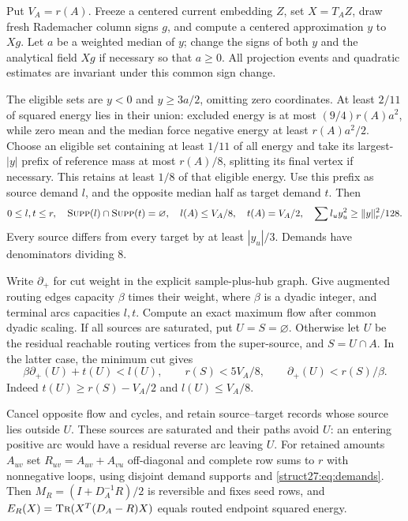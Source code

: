 \documentclass[11pt]{article}
\theoremstyle{remark}
\newcommand{\norm}[1]{\lVert#1\rVert}
\newcommand{\supp}{\textsc{Supp}}
\newcommand{\tr}{\textsc{Tr}}
\begin{document}
Put $V_A=r(A)$.
Freeze a centered current embedding $Z$, set $X=T_AZ$, draw fresh Rademacher
column signs $g$, and compute a centered approximation $y$ to $Xg$.
Let $a$ be a weighted median of $y$; change the signs of both $y$ and the
analytical field $Xg$ if necessary so that $a\ge0$.
All projection events and quadratic estimates are invariant under this common
sign change.

The eligible sets are $y<0$ and $y\ge3a/2$, omitting zero coordinates.
At least $2/11$ of squared energy lies in their union: excluded energy is at
most $(9/4)r(A)a^2$, while zero mean and the median force negative energy at
least $r(A)a^2/2$.
Choose an eligible set containing at least $1/11$ of all energy and take its
largest-$|y|$ prefix of reference mass at most $r(A)/8$, splitting its final
vertex if necessary.
This retains at least $1/8$ of that eligible energy.
Use this prefix as source demand $l$, and the opposite median half as target
demand $t$.
Then
\begin{equation}\label{struct27:eq:demands}
 0\le l,t\le r,\quad\supp(l)\cap\supp(t)=\varnothing,
 \quad l(A)\le V_A/8,\quad t(A)=V_A/2,
 \quad\sum l_uy_u^2\ge\norm{y}_r^2/128.
\end{equation}
Every source differs from every target by at least $|y_u|/3$.
Demands have denominators dividing 8.

Write $\partial_+$ for cut weight in the explicit sample-plus-hub graph.
Give augmented routing edges capacity $\beta$ times their weight, where $\beta$
is a dyadic integer, and terminal arcs capacities $l,t$.
Compute an exact maximum flow after common dyadic scaling.
If all sources are saturated, put $U=S=\varnothing$.
Otherwise let $U$ be the residual reachable routing vertices from the
super-source, and $S=U\cap A$.
In the latter case, the minimum cut gives
\begin{equation}\label{struct27:eq:seed}
 \beta\partial_+(U)+t(U)<l(U),\qquad
 r(S)<5V_A/8,\qquad \partial_+(U)<r(S)/\beta.
\end{equation}
Indeed $t(U)\ge r(S)-V_A/2$ and $l(U)\le V_A/8$.

Cancel opposite flow and cycles, and retain source--target records whose source
lies outside $U$.
These sources are saturated and their paths avoid $U$: an entering positive arc
would have a residual reverse arc leaving $U$.
For retained amounts $A_{uv}$ set $R_{uv}=A_{uv}+A_{vu}$ off-diagonal and
complete row sums to $r$ with nonnegative loops, using disjoint demand supports
and \eqref{struct27:eq:demands}.
Then $M_R=(I+D_A^{-1}R)/2$ is reversible and fixes seed rows, and
$E_R(X)=\tr(X^T(D_A-R)X)$ equals routed endpoint squared energy.
\end{document}
